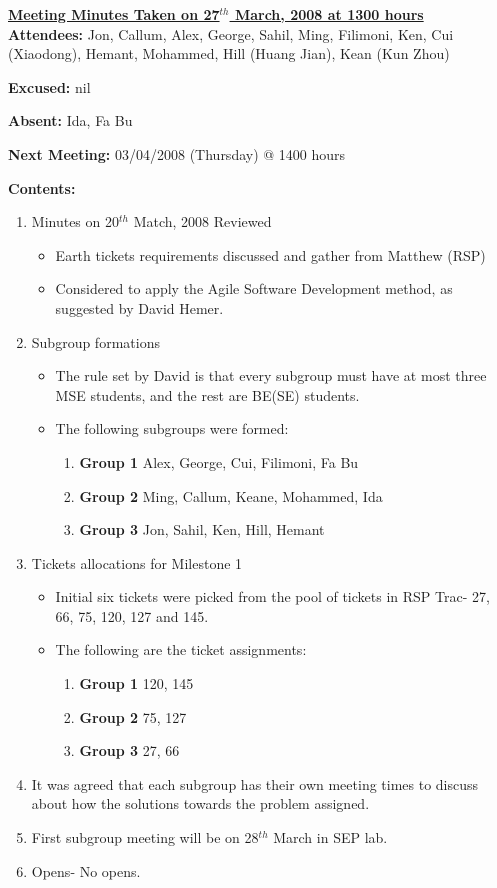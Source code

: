 \documentclass{letter}
\begin{document}
{\large \textbf{\underline{Meeting Minutes Taken on 27$^{th}$ March, 2008 at 1300 hours}}}\\

\textbf{Attendees:} Jon, Callum, Alex, George, Sahil, Ming, Filimoni, Ken, Cui (Xiaodong), Hemant, Mohammed, Hill (Huang Jian), Kean (Kun Zhou) 

\textbf{Excused:} nil

\textbf{Absent:} Ida, Fa Bu

\textbf{Next Meeting:} 03/04/2008 (Thursday) @ 1400 hours

\textbf{Contents:}

\begin{enumerate}
\item Minutes on 20$^{th}$ Match, 2008 Reviewed
	\begin{itemize}
	\item Earth tickets requirements discussed and gather from Matthew (RSP)
	\item Considered to apply the Agile Software Development method, as suggested by David Hemer. 
	\end{itemize}
\item Subgroup formations 
	\begin{itemize}
	\item The rule set by David is that every subgroup must have at most three MSE students, and the rest are BE(SE) students. 
	\item The following subgroups were formed:
		\begin{enumerate}
		\item \textbf{Group 1} Alex, George, Cui, Filimoni, Fa Bu
		\item \textbf{Group 2} Ming, Callum, Keane, Mohammed, Ida
		\item \textbf{Group 3} Jon, Sahil, Ken, Hill, Hemant
		\end{enumerate}
	\end{itemize}
\item Tickets allocations for Milestone 1
	\begin{itemize}
	\item Initial six tickets were picked from the pool of tickets in RSP Trac- 27, 66, 75, 120, 127 and 145. 
	\item The following are the ticket assignments:
		\begin{enumerate}
		\item \textbf{Group 1} 120, 145
		\item \textbf{Group 2} 75, 127 
		\item \textbf{Group 3} 27, 66
		\end{enumerate}
	\end{itemize}
\item It was agreed that each subgroup has their own meeting times to discuss about how the solutions towards the problem assigned. 
\item First subgroup meeting will be on 28$^{th}$ March in SEP lab. 
\item Opens- No opens.
\end{enumerate} 
\end{document}
